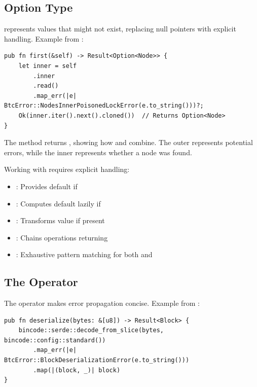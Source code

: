 \subsection{Option Type}
\label{subsec:ch24-option}

 represents values that might not exist, replacing null pointers with explicit handling. Example from :

\begin{listing}[htbp]
\caption{Option type in peer management}
\label{lst:ch24-option}
\begin{verbatim}
pub fn first(&self) -> Result<Option<Node>> {
    let inner = self
        .inner
        .read()
        .map_err(|e| BtcError::NodesInnerPoisonedLockError(e.to_string()))?;
    Ok(inner.iter().next().cloned())  // Returns Option<Node>
}
\end{verbatim}
\end{listing}

The  method returns , showing how  and  combine. The outer  represents potential errors, while the inner  represents whether a node was found.

Working with  requires explicit handling:
\begin{itemize}
  \item \textbf{}: Provides default if 
  \item \textbf{}: Computes default lazily if 
  \item \textbf{}: Transforms  value if present
  \item \textbf{}: Chains operations returning 
  \item \textbf{}: Exhaustive pattern matching for both  and 
\end{itemize}

\subsection{The  Operator}
\label{subsec:ch24-question-mark}

The  operator makes error propagation concise. Example from :

\begin{listing}[htbp]
\caption{Error propagation with the  operator}
\label{lst:ch24-question-mark}
\begin{verbatim}
pub fn deserialize(bytes: &[u8]) -> Result<Block> {
    bincode::serde::decode_from_slice(bytes, bincode::config::standard())
        .map_err(|e| BtcError::BlockDeserializationError(e.to_string()))
        .map(|(block, _)| block)
}
\end{verbatim}
\end{listing}


